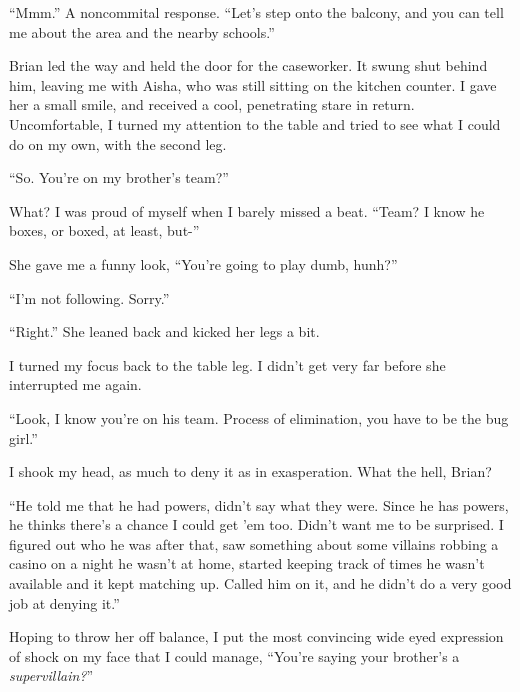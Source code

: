 ``Mmm.''  A noncommital response.  ``Let's step onto the balcony, and you can tell me about the area and the nearby schools.''



Brian led the way and held the door for the caseworker.  It swung shut behind him, leaving me with Aisha, who was still sitting on the kitchen counter.  I gave her a small smile, and received a cool, penetrating stare in return.  Uncomfortable, I turned my attention to the table and tried to see what I could do on my own, with the second leg.



``So.  You're on my brother's team?''



What?  I was proud of myself when I barely missed a beat.  ``Team?  I know he boxes, or boxed, at least, but-''



She gave me a funny look, ``You're going to play dumb, hunh?''



``I'm not following.  Sorry.''



``Right.''  She leaned back and kicked her legs a bit.



I turned my focus back to the table leg.  I didn't get very far before she interrupted me again.



``Look, I know you're on his team.  Process of elimination, you have to be the bug girl.''



I shook my head, as much to deny it as in exasperation.  What the hell, Brian?



``He told me that he had powers, didn't say what they were.  Since he has powers, he thinks there's a chance I could get 'em too.  Didn't want me to be surprised.  I figured out who he was after that, saw something about some villains robbing a casino on a night he wasn't at home, started keeping track of times he wasn't available and it kept matching up.  Called him on it, and he didn't do a very good job at denying it.''



Hoping to throw her off balance, I put the most convincing wide eyed expression of shock on my face that I could manage, ``You're saying your brother's a \emph{supervillain?}''



